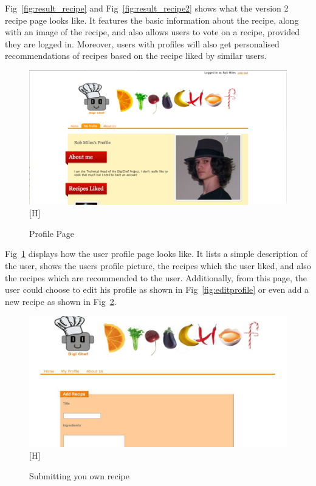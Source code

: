 Fig~\ref{fig:result_recipe} and Fig~\ref{fig:result_recipe2} shows what the version 2 recipe page looks like. It features the basic information about the recipe, along with an image of the recipe, and also allows users to vote on a recipe, provided they are logged in. Moreover, users with profiles will also get personalised recommendations of recipes based on the recipe liked by similar users.

\begin{figure}[H]
\includegraphics[width=1\textwidth]{result_profile}[H]
\caption{Profile Page}
\label{fig:result_profile}
\end{figure}

Fig~\ref{fig:result_profile} displays how the user profile page looks like. It lists a simple description of the user, shows the users profile picture, the recipes which the user liked, and also the recipes which are recommended to the user. Additionally, from this page, the user could choose to edit his profile as shown in Fig~\ref{fig:editprofile} or even add a new recipe as shown in Fig~\ref{fig:addrecipe}.


\begin{figure}[H]
\includegraphics[width=1\textwidth]{addrecipe}[H]
\caption{Submitting you own recipe}
\label{fig:addrecipe}
\end{figure}



